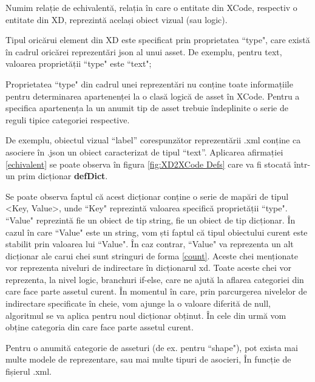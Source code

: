 \begin{mydef}\label{echivalent}
Numim relație de echivalentă, relația în care o entitate din XCode, respectiv o entitate din XD, reprezintă același obiect vizual (sau logic). 
\end{mydef}

\begin{myNote}\label{tip}
Tipul oricărui element din XD este specificat prin proprietatea ``type", care există în cadrul oricărei reprezentări json al unui asset. De exemplu, pentru text, valoarea proprietății ``type" este ``text";
\end{myNote}

\begin{myNote}\label{echivalent}
Proprietatea ``type" din cadrul unei reprezentări nu conține toate informațiile pentru determinarea apartenenței la o clasă logică de asset în XCode. Pentru a specifica apartenența la un anumit tip de asset trebuie îndeplinite o serie de reguli tipice categoriei respective.
\end{myNote}

De exemplu, obiectul vizual “label” corespunzător reprezentării .xml conține ca asociere în .json un obiect caracterizat de tipul “text”. Aplicarea afirmației \ref{echivalent} se poate observa în figura \ref{fig:XD2XCode Defs} care va fi stocată într-un prim dicționar \textbf{defDict}.

Se poate observa faptul că acest dicționar conține o serie de mapări de tipul <Key, Value>, unde ``Key" reprezintă valoarea specifică proprietății ``type". ``Value" reprezintă fie un obiect de tip string, fie un obiect de tip dicționar. În cazul în care ``Value" este un string, vom ști faptul că tipul obiectului curent este stabilit prin valoarea lui ``Value". În caz contrar, ``Value" va reprezenta un alt dicționar ale carui chei sunt stringuri de forma \ref{count}. Aceste chei menționate vor reprezenta niveluri de indirectare în dicționarul xd. Toate aceste chei vor reprezenta, la nivel logic, branchuri if-else, care ne ajută la aflarea categoriei din care face parte assetul curent. În momentul în care, prin parcurgerea nivelelor de indirectare specificate în cheie, vom ajunge la o valoare diferită de null, algoritmul se va aplica pentru noul dicționar obținut. În cele din urmă vom obține categoria din care face parte assetul curent. 

\begin{myNote}\label{tip similar}

Pentru o anumită categorie de asseturi (de ex. pentru ``shape"), pot exista mai multe modele de reprezentare, sau mai multe tipuri de asocieri, În funcție de fișierul .xml.
\end{myNote}

